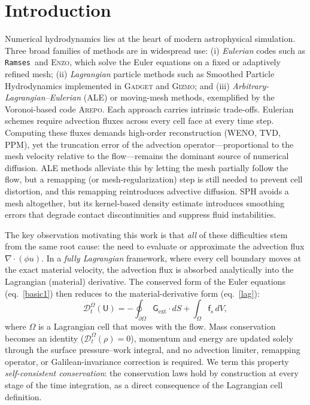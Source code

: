 \documentclass[twocolumn]{aastex63}
\newcommand{\ramses}{{\texttt{Ramses}}}
\newcommand{\vel}{{u}}
\newcommand{\surf}[0]{S}
\begin{document}
\section{\label{sec:in}Introduction}

Numerical hydrodynamics lies at the heart of modern
astrophysical simulation.
Three broad families of methods are in widespread use:
(i) \emph{Eulerian} codes such as \ramses\ and \textsc{Enzo},
which solve the Euler equations on a fixed or adaptively refined
mesh;
(ii) \emph{Lagrangian} particle methods such as Smoothed Particle
Hydrodynamics \citep[SPH;][]{Lucy1977,GingoldMonaghan1977}
implemented in \textsc{Gadget} and \textsc{Gizmo}; and
(iii) \emph{Arbitrary-Lagrangian--Eulerian} (ALE) or moving-mesh
methods, exemplified by the Voronoi-based code \textsc{Arepo}.
Each approach carries intrinsic trade-offs.
Eulerian schemes require advection fluxes across every cell face
at every time step.  Computing these fluxes demands high-order
reconstruction (WENO, TVD, PPM), yet the truncation error of the
advection operator---proportional to the mesh velocity relative
to the flow---remains the dominant source of numerical diffusion.
ALE methods alleviate this by letting the mesh partially follow
the flow, but a remapping (or mesh-regularization) step is still
needed to prevent cell distortion, and this remapping reintroduces
advective diffusion.
SPH avoids a mesh altogether, but its kernel-based density
estimate introduces smoothing errors that degrade contact
discontinuities and suppress fluid instabilities.

The key observation motivating this work is that
\emph{all} of these difficulties stem from the same root cause:
the need to evaluate or approximate the advection flux
$\nabla\!\cdot\!(\phi\vel)$.
In a \emph{fully Lagrangian} framework, where every cell boundary
moves at the exact material velocity, the advection flux is
absorbed analytically into the Lagrangian (material) derivative.
The conserved form of the Euler equations (eq.~\ref{basic1}) then
reduces to the material-derivative form (eq.~\ref{lag}):
\begin{equation*}
  \mathcal{D}_t^\Omega(\mathsf{U})
  = -\oint_{\partial\Omega}\mathsf{G}_\mathrm{ext}\cdot d\surf
    + \int_\Omega \mathsf{f}_s\,dV,
\end{equation*}
where $\Omega$ is a Lagrangian cell that moves with the flow.
Mass conservation becomes an identity
($\mathcal{D}_t^\Omega(\rho)=0$), momentum and energy are
updated solely through the surface pressure--work integral,
and no advection limiter, remapping operator, or
Galilean-invariance correction is required.
We term this property \emph{self-consistent conservation}:
the conservation laws hold by construction at every stage of the
time integration, as a direct consequence of the Lagrangian
cell definition.
\end{document}
